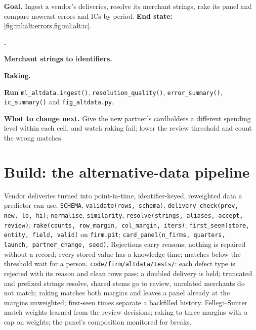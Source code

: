 \begin{tutorial}
\textbf{Goal.} Ingest a vendor's deliveries, resolve its merchant strings, rake its panel and compare nowcast errors and ICs
by period. \textbf{End state:} \cref{fig:ml:alt:errors,fig:ml:alt:ic}.
\begin{tutsteps}
\item \textbf{.}
\label{lst:ml:alt:validate}
\item \textbf{Merchant strings to identifiers.}
\label{lst:ml:alt:resolve}
\item \textbf{Raking.}
\label{lst:ml:alt:rake}
\item \textbf{Run} \texttt{ml\_altdata.ingest()}, \texttt{resolution\_quality()}, \texttt{error\_summary()},
\texttt{ic\_summary()} and \texttt{fig\_altdata.py}.
\end{tutsteps}
\textbf{What to change next.} Give the new partner's cardholders a different spending level within each cell, and watch
raking fail; lower the review threshold and count the wrong matches.
\end{tutorial}

\section{Build: the alternative-data pipeline}\label{bld:ml:alternative-data-pipelines:altdata}

\begin{build}
 Vendor deliveries turned into point-in-time, identifier-keyed, reweighted data a predictor can use.
 \texttt{SCHEMA}, \texttt{validate(rows, schema)}, \texttt{delivery\_check(prev, new, lo, hi)};
\texttt{normalise}, \texttt{similarity}, \texttt{resolve(strings, aliases, accept, review)}; \texttt{rake(counts, row\_margin,
col\_margin, iters)}; \texttt{first\_seen(store, entity, field, valid)} on \texttt{firm.pit}; \texttt{card\_panel(n\_firms,
quarters, launch, partner\_change, seed)}.
 Rejections carry reasons; nothing is repaired without a record; every stored value has a knowledge time;
matches below the threshold wait for a person.
 \texttt{code/firm/altdata/tests/}: each defect type is rejected with its reason and clean rows pass;
a doubled delivery is held; truncated and prefixed strings resolve, shared stems go to review, unrelated merchants do not
match; raking matches both margins and leaves a panel already at the margins unweighted; first-seen times separate a
backfilled history.
 Fellegi--Sunter match weights learned from the review decisions; raking to three margins with a cap on
weights; the panel's composition monitored for breaks.
\end{build}

